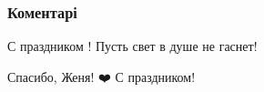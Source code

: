  
 
 
 
 
\subsubsection{Коментарі}
\label{sec:02_08_2021.fb.bilchenko_evgenia.3.prorok_ilja.cmt}

\begin{itemize}
 
С праздником ! Пусть свет в душе не гаснет!

 
Спасибо, Женя! ❤️ С праздником!
\end{itemize}

